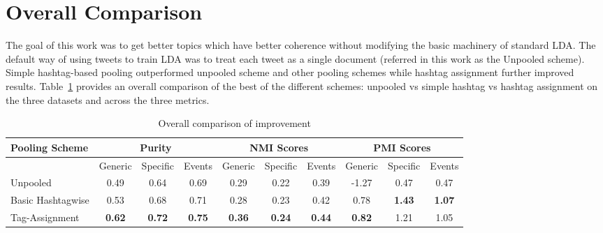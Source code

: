 \documentclass[10pt,a5paper,twoside]{article}
\begin{document}
\section{Overall Comparison}

\label{sec:overall}

The goal of this work was to get better topics which have better
coherence without modifying the basic machinery of standard LDA. The
default way of using tweets to train LDA was to treat each tweet as a
single document (referred in this work as the Unpooled scheme). Simple
hashtag-based pooling outperformed unpooled scheme and other pooling
schemes while hashtag assignment further improved
results. Table~\ref{tbl-10} provides an overall comparison of the best
of the different schemes: unpooled vs simple hashtag vs hashtag
assignment on the three datasets and across the three metrics.

\begin{table}[!h]
\centering
\resizebox{14cm}{!} 
{
	\begin{tabular}{|l|ccc|ccc|ccc|}
	\hline
	Pooling Scheme  & \multicolumn {3}{c}{Purity} & \multicolumn {3}{c}{NMI Scores} & \multicolumn {3}{c|}{PMI Scores}\\
	\hline
	 & Generic & Specific & Events &  Generic & Specific & Events &  Generic & Specific & Events\\
	\hline
	Unpooled & 0.49 & 0.64 & 0.69 & 0.29 & 0.22 & 0.39 & -1.27 & 0.47 & 0.47 \\
	\hline
	Basic Hashtagwise & 0.53 & 0.68 & 0.71 & 0.28 & 0.23 & 0.42 & 0.78 & \textbf{1.43} & \textbf{1.07} \\
	\hline
	Tag-Assignment & \textbf{0.62} & \textbf{0.72} & \textbf{0.75} & \textbf{0.36} & \textbf{0.24} & \textbf{0.44} & \textbf{0.82} & 1.21 & 1.05 \\
	\hline
	\end{tabular}
}
\vspace{-4mm}
\caption{ Overall comparison of improvement}\label{tbl-10}
\end{table}
\end{document}
